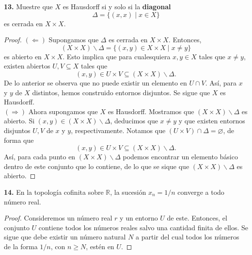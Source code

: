 \documentclass{article}
\begin{document}
\begin{mybox}
	\textbf{13. } Muestre que $X$ es Hausdorff si y solo si la \textbf{diagonal}
	$$ \Delta = \{ (x, x) \mid x \in X \} $$
	es cerrada en $ X \times X$.
\end{mybox}	
\begin{proof}
	$(\Leftarrow)$ Supongamos que $\Delta$ es cerrada en $X \times X$. Entonces, 
	$$ \left( X \times X \right)  \backslash \Delta = \{ (x, y) \in X \times X \mid x \neq y \}$$ 
es abierto en $X \times X$. Esto implica que para cualesquiera $x, y \in X$ tales que $x \neq y$, existen abiertos $U, V \subseteq X$ tales que
$$ (x, y) \in U \times V \subseteq  \left( X \times X \right)  \backslash \Delta. $$
De lo anterior se observa que no puede existir un elemento en $U \cap V$. Así, para $x$ y $y$ de $X$ distintos, hemos construido entornos disjuntos. Se sigue que $X$ es Hausdorff.\\
$(\Rightarrow)$ Ahora supongamos que $X$ es Hausdorff. Mostramos que $\left( X \times X \right)  \backslash \Delta$ es abierto. Si $(x, y) \in \left( X \times X \right)  \backslash \Delta$, deducimos que $x \neq y$ y que existen entornos disjuntos $U, V$ de $x$ y $y$, respectivamente. Notamos que $ (U \times V) \cap \Delta = \varnothing$, de forma que 
$$(x, y) \in U \times V \subseteq \left( X \times X \right)  \backslash \Delta.$$ 
Así, para cada punto en $\left( X \times X \right)  \backslash \Delta$ podemos encontrar un elemento básico dentro de este conjunto que lo contiene, de lo que se sique que $\left( X \times X \right)  \backslash \Delta$ es abierto. 
\end{proof}

\begin{mybox}
	\textbf{14. } En la topología cofinita sobre $\mathbb{R}$, la sucesión $x_{n} = 1/n$ converge a todo número real. 
\end{mybox}	
\begin{proof}
	Consideremos un número real $r$ y un entorno $U$ de este. Entonces, el conjunto $U$ contiene todos los números reales salvo una cantidad finita de ellos. Se sigue que debe existir un número natural $N$ a partir del cual todos los números de la forma $1/n$, con $n \geq N$, estén en $U$.  
\end{proof}
\end{document}
